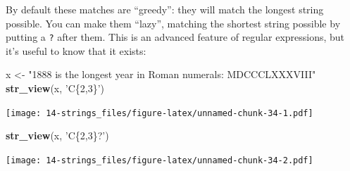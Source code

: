\documentclass[]{book}
\newenvironment{Shaded}{\begin{snugshade}}{\end{snugshade}}
\newcommand{\KeywordTok}[1]{\textcolor[rgb]{0.13,0.29,0.53}{\textbf{#1}}}
\newcommand{\NormalTok}[1]{#1}
\newcommand{\StringTok}[1]{\textcolor[rgb]{0.31,0.60,0.02}{#1}}
\theoremstyle{definition}
\theoremstyle{definition}
\theoremstyle{definition}
\theoremstyle{remark}
\begin{document}
By default these matches are ``greedy'': they will match the longest
string possible. You can make them ``lazy'', matching the shortest
string possible by putting a \texttt{?} after them. This is an advanced
feature of regular expressions, but it's useful to know that it exists:

\begin{Shaded}
\begin{Highlighting}[]
\NormalTok{x <-}\StringTok{ "1888 is the longest year in Roman numerals: MDCCCLXXXVIII"}
\KeywordTok{str_view}\NormalTok{(x, }\StringTok{'C\{2,3\}'}\NormalTok{)}
\end{Highlighting}
\end{Shaded}

\texttt{[image: 14-strings\_files/figure-latex/unnamed-chunk-34-1.pdf]}

\begin{Shaded}
\begin{Highlighting}[]
\KeywordTok{str_view}\NormalTok{(x, }\StringTok{'C\{2,3\}?'}\NormalTok{)}
\end{Highlighting}
\end{Shaded}

\texttt{[image: 14-strings\_files/figure-latex/unnamed-chunk-34-2.pdf]}
\end{document}
